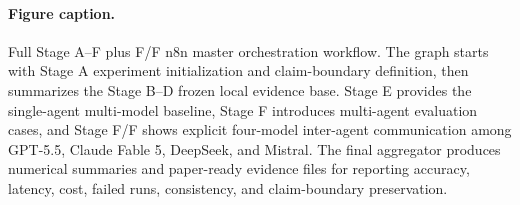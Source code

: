 \paragraph{Figure caption.}
Full Stage A--F plus F/F n8n master orchestration workflow. The graph starts with Stage A experiment initialization and claim-boundary definition, then summarizes the Stage B--D frozen local evidence base. Stage E provides the single-agent multi-model baseline, Stage F introduces multi-agent evaluation cases, and Stage F/F shows explicit four-model inter-agent communication among GPT-5.5, Claude Fable 5, DeepSeek, and Mistral. The final aggregator produces numerical summaries and paper-ready evidence files for reporting accuracy, latency, cost, failed runs, consistency, and claim-boundary preservation.
